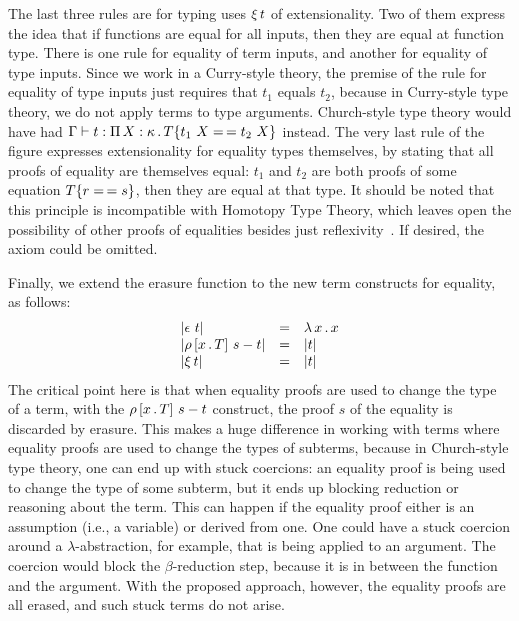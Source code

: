 \documentclass{article}
\begin{document}
The last three rules are for typing uses $\ext{t}$ of extensionality.
Two of them express the idea that if functions are equal for all
inputs, then they are equal at function type.  There is one rule for
equality of term inputs, and another for equality of type inputs.
Since we work in a Curry-style theory, the premise of the rule for
equality of type inputs just requires that $t_1$ equals $t_2$, because
in Curry-style type theory, we do not apply terms to type arguments.
Church-style type theory would have had $\Gamma \vdash t :
\Pia{X}{\kappa}{\eqtm{t_1\ X}{T}{t_2\ X}}$ instead.  The very last
rule of the figure expresses extensionality for equality types
themselves, by stating that all proofs of equality are themselves
equal: $t_1$ and $t_2$ are both proofs of some equation
$\eqtm{r}{T}{s}$, then they are equal at that type.  It should be
noted that this principle is incompatible with Homotopy Type Theory,
which leaves open the possibility of other proofs of equalities
besides just reflexivity~\cite{hottbook}.  If desired, the axiom could
be omitted.

Finally, we extend the erasure function to the new term constructs
for equality, as follows:
\[
\begin{array}{lll}
  |\rfl{t}| & = & \lam{x}{x} \\
  |\cng{x}{T}{s}{t}| & = & |t| \\
  |\ext{t}| & = & |t|
\end{array}
\]
\noindent The critical point here is that when equality proofs are
used to change the type of a term, with the $\cng{x}{T}{s}{t}$
construct, the proof $s$ of the equality is discarded by erasure.
This makes a huge difference in working with terms where equality
proofs are used to change the types of subterms, because in
Church-style type theory, one can end up with stuck coercions: an
equality proof is being used to change the type of some subterm, but
it ends up blocking reduction or reasoning about the term.  This can
happen if the equality proof either is an assumption (i.e., a
variable) or derived from one.  One could have a stuck coercion around
a $\lambda$-abstraction, for example, that is being applied to an
argument.  The coercion would block the $\beta$-reduction step,
because it is in between the function and the argument.  With the
proposed approach, however, the equality proofs are all erased, and
such stuck terms do not arise.
\end{document}
